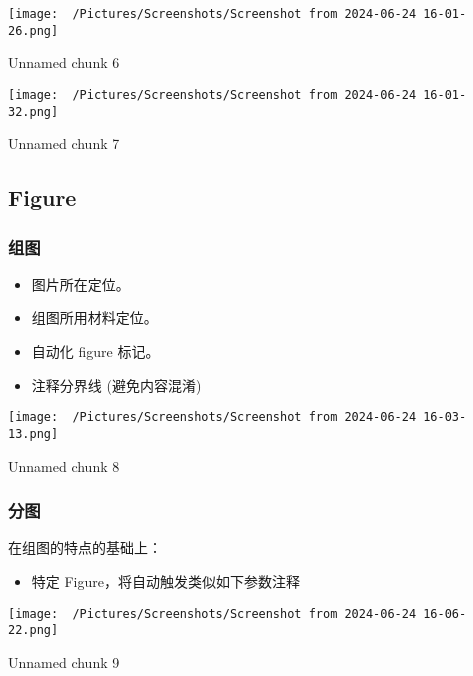 \documentclass[
]{article}
\providecommand{\tightlist}{%
  \setlength{\itemsep}{0pt}\setlength{\parskip}{0pt}}
\begin{document}
\def\@captype{figure}
\begin{center}
\texttt{[image: ~/Pictures/Screenshots/Screenshot from 2024-06-24 16-01-26.png]}
\caption{Unnamed chunk 6}\label{fig:unnamed-chunk-6}
\end{center}

\def\@captype{figure}
\begin{center}
\texttt{[image: ~/Pictures/Screenshots/Screenshot from 2024-06-24 16-01-32.png]}
\caption{Unnamed chunk 7}\label{fig:unnamed-chunk-7}
\end{center}

\hypertarget{figure}{%
\subsection{Figure}\label{figure}}

\hypertarget{ux7ec4ux56fe}{%
\subsubsection{组图}\label{ux7ec4ux56fe}}

\begin{itemize}
\tightlist
\item
  图片所在定位。
\item
  组图所用材料定位。
\item
  自动化 figure 标记。
\item
  注释分界线 (避免内容混淆)
\end{itemize}

\def\@captype{figure}
\begin{center}
\texttt{[image: ~/Pictures/Screenshots/Screenshot from 2024-06-24 16-03-13.png]}
\caption{Unnamed chunk 8}\label{fig:unnamed-chunk-8}
\end{center}

\hypertarget{ux5206ux56fe}{%
\subsubsection{分图}\label{ux5206ux56fe}}

在组图的特点的基础上：

\begin{itemize}
\tightlist
\item
  特定 Figure，将自动触发类似如下参数注释
\end{itemize}

\def\@captype{figure}
\begin{center}
\texttt{[image: ~/Pictures/Screenshots/Screenshot from 2024-06-24 16-06-22.png]}
\caption{Unnamed chunk 9}\label{fig:unnamed-chunk-9}
\end{center}
\end{document}
